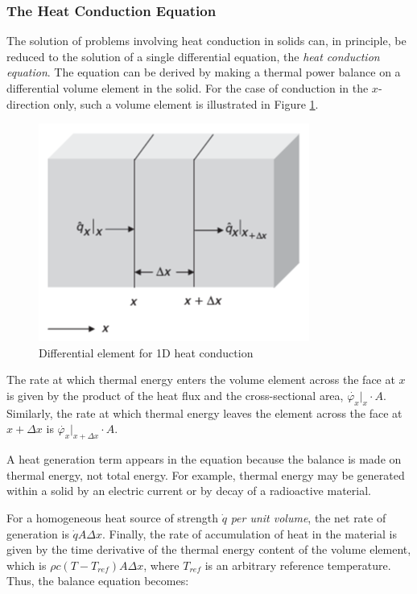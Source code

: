 \subsubsection{The Heat Conduction Equation}

The solution of problems involving heat conduction in solids can, in principle, be reduced to the
solution of a single differential equation, the \emph{heat conduction equation}. The equation can be derived
by making a thermal power balance on a differential volume element in the solid. For the case of
conduction in the $x$-direction only, such a volume element is illustrated in Figure \ref{fig:element_1d}. 

\begin{figure}[H]
	\centering
	\includegraphics[width=0.5\columnwidth]{Figures/Element.png}
	\caption[Short title]{Differential element for 1D heat conduction}
	\label{fig:element_1d}
\end{figure}

The rate at which thermal energy enters the volume element across the face at $x$ is given by the
product of the heat flux and the cross-sectional area, $\dot{\varphi_x}|_x \cdot A$.
Similarly, the rate at which thermal energy leaves the element across the face at $x + \Delta x$ is $\dot{\varphi_x}|_{x + \Delta x} \cdot A$. 

A heat generation term appears in the equation because the balance is made on thermal energy, not
total energy. For example, thermal energy may be generated within a solid by an electric current
or by decay of a radioactive material.

For a homogeneous heat source of strength $\dot{q}$ \emph{per unit volume}, the net rate of generation is $\dot{q}A \Delta x$. Finally, the rate of accumulation of heat in the material is given by the time derivative of the thermal energy content of the volume element, which is $\rho c(T - T_{ref} )A\Delta x$, where $T_{ref}$ is an arbitrary reference temperature. Thus, the balance equation
becomes:

